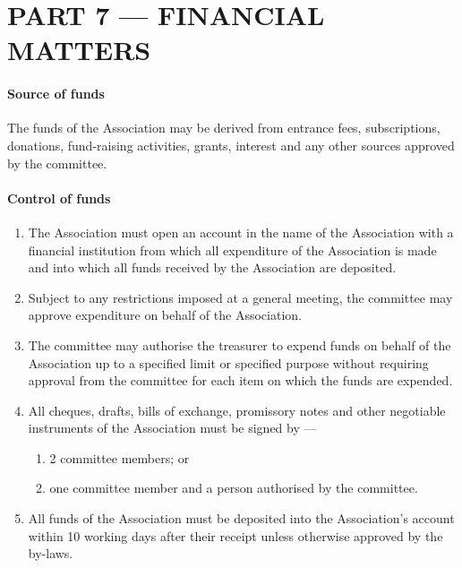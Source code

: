 \documentclass[../constitution.tex]{subfiles}
\begin{document}
\hypertarget{part-7-financial-matters}{%
\part{PART 7 --- FINANCIAL MATTERS}\label{part-7-financial-matters}}

\hypertarget{source-of-funds}{%
\subsection{Source of funds}\label{source-of-funds}}

The funds of the Association may be derived from entrance fees, subscriptions, donations, fund-raising activities, grants, interest and any other sources approved by the committee.

\hypertarget{control-of-funds}{%
\subsection{Control of funds}\label{control-of-funds}}

\begin{enumerate}

\item The Association must open an account in the name of the Association with a financial institution from which all expenditure of the Association is made and into which all funds received by the Association are deposited.
\item Subject to any restrictions imposed at a general meeting, the committee may approve expenditure on behalf of the Association.
\item The committee may authorise the treasurer to expend funds on behalf of the Association up to a specified limit or specified purpose without requiring approval from the committee for each item on which the funds are expended.
\item All cheques, drafts, bills of exchange, promissory notes and other negotiable instruments of the Association must be signed by ---

  \begin{enumerate}
  
  \item 2 committee members; or
  \item one committee member and a person authorised by the committee.
  \end{enumerate}
\item All funds of the Association must be deposited into the Association's account within 10 working days after their receipt unless otherwise approved by the by-laws.
\end{enumerate}
\end{document}
